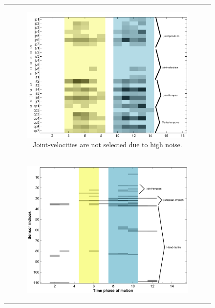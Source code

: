 \begin{figure}[]
    \begin{center}
    \begin{tabular}{c}
        \begin{subfigure}[]{0.8\linewidth}
            \includegraphics[width=\linewidth]{images/tvr_table_p}
            \caption{Joint-velocities are not selected due to high noise.}
            \label{fig:tvr_table_p}
        \end{subfigure}\\
        \begin{subfigure}[]{0.78\linewidth}
            \includegraphics[width=\linewidth]{images/tvr_table_h}

\end{subfigure}
\end{tabular}
\end{center}
\end{figure}
